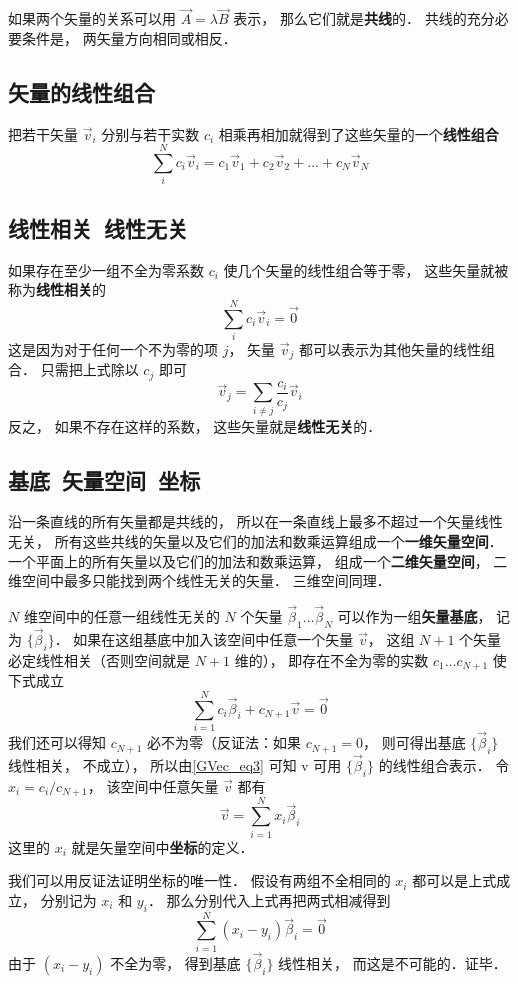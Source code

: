 如果两个矢量的关系可以用 $\vec A = \lambda\vec B$ 表示， 那么它们就是\textbf{共线}的． 共线的充分必要条件是， 两矢量方向相同或相反．

\subsection{矢量的线性组合}
把若干矢量 $\vec v_i$ 分别与若干实数 $c_i$ 相乘再相加就得到了这些矢量的一个\textbf{线性组合}
\begin{equation}
\sum_i^N c_i \vec v_i = c_1\vec v_1 + c_2\vec v_2 +\dots +c_N \vec v_N
\end{equation}

\subsection{线性相关\ 线性无关}
如果存在至少一组不全为零系数 $c_i$ 使几个矢量的线性组合等于零， 这些矢量就被称为\textbf{线性相关}的
\begin{equation}
\sum_i^N c_i \vec v_i = \vec 0
\end{equation}
这是因为对于任何一个不为零的项 $j$， 矢量 $\vec v_j$ 都可以表示为其他矢量的线性组合． 只需把上式除以 $c_j$ 即可
\begin{equation}\label{GVec_eq3}
\vec v_j = \sum_{i \ne j}\frac{c_i}{c_j} \vec v_i
\end{equation}
反之， 如果不存在这样的系数， 这些矢量就是\textbf{线性无关}的． 

\subsection{基底\ 矢量空间\ 坐标}
沿一条直线的所有矢量都是共线的， 所以在一条直线上最多不超过一个矢量线性无关， 所有这些共线的矢量以及它们的加法和数乘运算组成一个\textbf{一维矢量空间}． 一个平面上的所有矢量以及它们的加法和数乘运算， 组成一个\textbf{二维矢量空间}， 二维空间中最多只能找到两个线性无关的矢量． 三维空间同理． 

$N$ 维空间中的任意一组线性无关的 $N$ 个矢量 $\vec \beta_1\dots \vec \beta_N$ 可以作为一组\textbf{矢量基底}， 记为 $\{\vec \beta_i\}$． 如果在这组基底中加入该空间中任意一个矢量 $\vec v$， 这组 $N+1$ 个矢量必定线性相关（否则空间就是 $N+1$ 维的）， 即存在不全为零的实数 $c_1\dots c_{N+1}$ 使下式成立
\begin{equation}
\sum_{i=1}^N c_i \vec \beta_i + c_{N+1} \vec v = \vec 0
\end{equation}
我们还可以得知 $c_{N+1}$ 必不为零（反证法：如果 $c_{N+1} = 0$， 则可得出基底 $\{\vec \beta_i\}$ 线性相关， 不成立）， 所以由\autoref{GVec_eq3} 可知 \vec v 可用 $\{\vec \beta_i\}$ 的线性组合表示． 令 $x_i = c_i/c_{N+1}$， 该空间中任意矢量 $\vec v$ 都有
\begin{equation}
\vec v = \sum_{i=1}^N x_i \vec \beta_i
\end{equation}
这里的 $x_i$ 就是矢量空间中\textbf{坐标}的定义．

我们可以用反证法证明坐标的唯一性． 假设有两组不全相同的 $x_i$ 都可以是上式成立， 分别记为 $x_i$ 和 $y_i$． 那么分别代入上式再把两式相减得到
\begin{equation}
\sum_{i=1}^N (x_i-y_i) \vec \beta_i = \vec 0
\end{equation}
由于 $(x_i-y_i)$ 不全为零， 得到基底 $\{\vec \beta_i\}$ 线性相关， 而这是不可能的．证毕．





